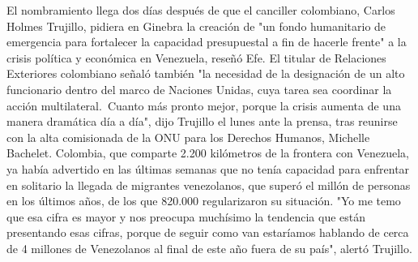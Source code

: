 \documentclass{article}%
\begin{document}
\newline%
%
El nombramiento llega dos días después de que el canciller colombiano, Carlos Holmes Trujillo, pidiera en Ginebra la creación de "un fondo humanitario de emergencia para fortalecer la capacidad presupuestal a fin de hacerle frente" a la crisis política y económica en Venezuela, reseñó Efe.%
\newline%
%
El titular de Relaciones Exteriores colombiano señaló también "la necesidad de la designación de un alto funcionario dentro del marco de Naciones Unidas, cuya tarea sea coordinar la acción multilateral.~Cuanto más pronto mejor, porque la crisis aumenta de una manera dramática día a día", dijo Trujillo el lunes ante la prensa, tras reunirse con la alta comisionada de la ONU para los Derechos Humanos, Michelle Bachelet.%
\newline%
%
Colombia, que comparte 2.200 kilómetros de la frontera con Venezuela, ya había advertido en las últimas semanas que no tenía capacidad para enfrentar en solitario la llegada de migrantes venezolanos, que superó el millón de personas en los últimos años, de los que 820.000 regularizaron su situación.%
\newline%
%
"Yo me temo que esa cifra es mayor y nos preocupa muchísimo la tendencia que están presentando esas cifras, porque de seguir como van estaríamos hablando de cerca de 4 millones de Venezolanos al final de este año fuera de su país", alertó Trujillo.%
\newline%
%
\end{document}
